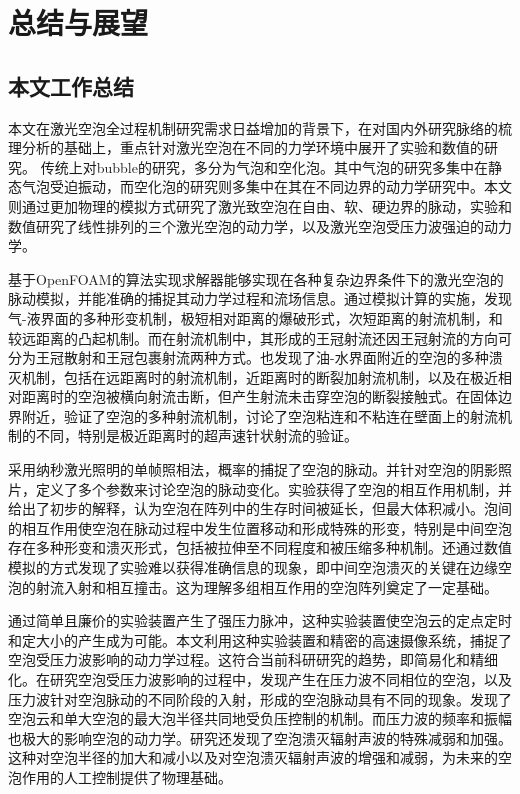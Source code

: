 \chapter{总结与展望}
\label{chap:future}
\section{本文工作总结}
本文在激光空泡全过程机制研究需求日益增加的背景下，在对国内外研究脉络的梳理分析的基础上，重点针对激光空泡在不同的力学环境中展开了实验和数值的研究。
传统上对bubble的研究，多分为气泡和空化泡。其中气泡的研究多集中在静态气泡受迫振动，而空化泡的研究则多集中在其在不同边界的动力学研究中。本文则通过更加物理的模拟方式研究了激光致空泡在自由、软、硬边界的脉动，实验和数值研究了线性排列的三个激光空泡的动力学，以及激光空泡受压力波强迫的动力学。

基于OpenFOAM的算法实现求解器能够实现在各种复杂边界条件下的激光空泡的脉动模拟，并能准确的捕捉其动力学过程和流场信息。通过模拟计算的实施，发现气-液界面的多种形变机制，极短相对距离的爆破形式，次短距离的射流机制，和较远距离的凸起机制。而在射流机制中，其形成的王冠射流还因王冠射流的方向可分为王冠散射和王冠包裹射流两种方式。也发现了油-水界面附近的空泡的多种溃灭机制，包括在远距离时的射流机制，近距离时的断裂加射流机制，以及在极近相对距离时的空泡被横向射流击断，但产生射流未击穿空泡的断裂接触式。在固体边界附近，验证了空泡的多种射流机制，讨论了空泡粘连和不粘连在壁面上的射流机制的不同，特别是极近距离时的超声速针状射流的验证。

采用纳秒激光照明的单帧照相法，概率的捕捉了空泡的脉动。并针对空泡的阴影照片，定义了多个参数来讨论空泡的脉动变化。实验获得了空泡的相互作用机制，并给出了初步的解释，认为空泡在阵列中的生存时间被延长，但最大体积减小。泡间的相互作用使空泡在脉动过程中发生位置移动和形成特殊的形变，特别是中间空泡存在多种形变和溃灭形式，包括被拉伸至不同程度和被压缩多种机制。还通过数值模拟的方式发现了实验难以获得准确信息的现象，即中间空泡溃灭的关键在边缘空泡的射流入射和相互撞击。这为理解多组相互作用的空泡阵列奠定了一定基础。

通过简单且廉价的实验装置产生了强压力脉冲，这种实验装置使空泡云的定点定时和定大小的产生成为可能。本文利用这种实验装置和精密的高速摄像系统，捕捉了空泡受压力波影响的动力学过程。这符合当前科研研究的趋势，即简易化和精细化。在研究空泡受压力波影响的过程中，发现产生在压力波不同相位的空泡，以及压力波针对空泡脉动的不同阶段的入射，形成的空泡脉动具有不同的现象。发现了空泡云和单大空泡的最大泡半径共同地受负压控制的机制。而压力波的频率和振幅也极大的影响空泡的动力学。研究还发现了空泡溃灭辐射声波的特殊减弱和加强。这种对空泡半径的加大和减小以及对空泡溃灭辐射声波的增强和减弱，为未来的空泡作用的人工控制提供了物理基础。

